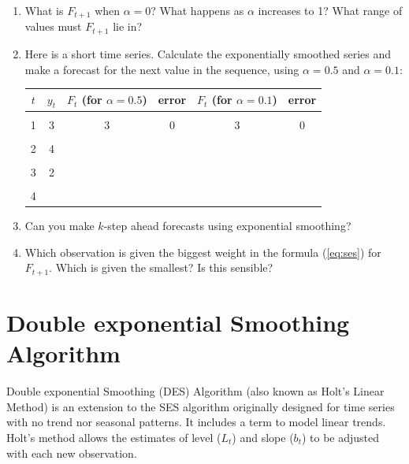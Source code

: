 \documentclass[a4paper,11pt,oneside,onecolumn]{book}
\begin{document}
\begin{enumerate}
\item What is $F_{t+1}$ when $\alpha = 0$? What
happens as $\alpha$ increases to 1? What range of values must
$F_{t+1}$ lie in?


\item Here is a short time series. Calculate the
exponentially smoothed series and make a forecast for the next value
in the sequence, using $\alpha = 0.5$ and $\alpha = 0.1$:


\begin{center}
\begin{tabular}{|c|c|cc|cc|}
\multicolumn{1}{|c|}{$t$} & \multicolumn{1}{c|}{$y_t$} &
\multicolumn{1}{p{3cm}}{\hspace{.5cm}$F_t$ (for $\alpha = 0.5$)} &
\multicolumn{1}{p{2cm}|}{\hspace{.6cm}error} &
\multicolumn{1}{p{3cm}}{\hspace{.5cm}$F_t$ (for $\alpha = 0.1$)} &
\multicolumn{1}{p{2cm}|}{\hspace{.6cm}error} \\ \hline
  &       &   &   &   &   \\
1 & 3     & 3 & 0 & 3 & 0 \\
  &       &   &   &   &   \\
2 & 4     &   &   &   &   \\
  &       &   &   &   &   \\
3 & 2     &   &   &   &   \\
  &       &   &   &   &   \\
4 &       &   &   &   & \end{tabular}
\end{center}


\item Can you make $k$-step ahead forecasts using exponential smoothing?
\item Which observation is given the biggest weight in
the formula (\ref{eq:ses}) for $F_{t+1}$. Which is given the smallest? Is this
sensible?
\end{enumerate}






\chapter{Double exponential Smoothing Algorithm} 
\label{sec:des:chp}

Double exponential Smoothing (DES) Algorithm (also known as  Holt's Linear Method) is an extension to the SES algorithm originally designed for time series with no trend nor seasonal patterns.
 It includes  a term to model linear trends. 
Holt's method allows the estimates of level  ($L_t$) and slope ($b_t$) to be adjusted with each new
observation.  
\end{document}
